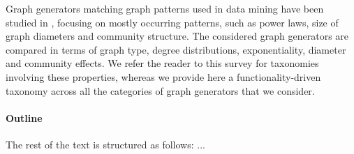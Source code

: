 Graph generators matching graph patterns used in data mining have been
studied in \cite{Chakrabarti:2006:GML:1132952.1132954}, 
focusing on mostly occurring patterns, such as power laws, size of graph diameters
and community structure. The considered graph generators are compared in
terms of graph type, degree distributions, exponentiality, diameter and
community effects. We refer the reader to this survey for taxonomies
involving these properties, whereas we provide here a functionality-driven
taxonomy across all the categories of graph generators that we consider.    



\paragraph*{Outline} The rest of the text is structured as follows: ...


